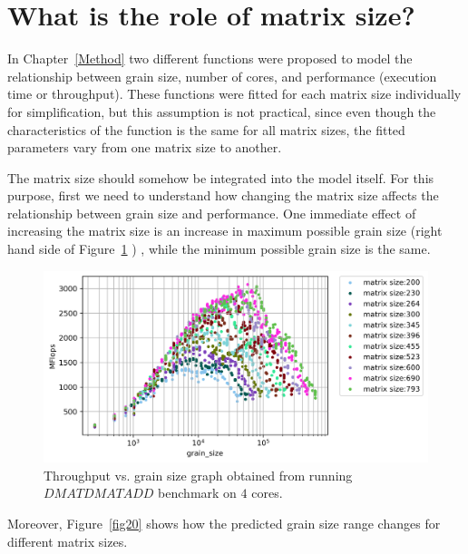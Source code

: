 \section{What is the role of matrix size?}
In Chapter~\ref{Method} two different functions were proposed to model the relationship between grain size, number of cores, and performance (execution time or throughput). These functions were fitted for each matrix size individually for simplification, but this assumption is not practical, since even though the characteristics of the function is the same for all matrix sizes, the fitted parameters vary from one matrix size to another. 

The matrix size should somehow be integrated into the model itself. For this purpose, first we need to understand how changing the matrix size affects the relationship between grain size and performance. 
One immediate effect of increasing the matrix size is an increase in maximum possible grain size (right hand side of Figure~\ref{fig19} ) , while the minimum possible grain size is the same.

\vspace{\baselineskip}	
\begin{figure}[H]	
	\centering\includegraphics[scale=.75]{images/fig11.png}			
	\caption{Throughput vs. grain size graph obtained from running $DMATDMATADD$ benchmark  on $4$ cores.}
	\label{fig19}	
\end{figure} 


Moreover, Figure~\ref{fig20} shows how the predicted grain size range changes for different matrix sizes.
 
